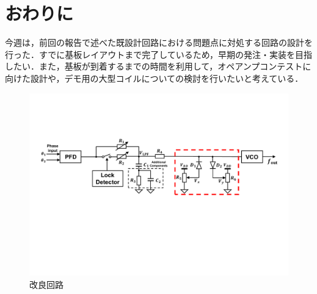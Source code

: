 \documentclass[twocolumn]{jsarticle}
\begin{document}
\section{おわりに}
今週は，前回の報告で述べた既設計回路における問題点に対処する回路の設計を行った．すでに基板レイアウトまで完了しているため，早期の発注・実装を目指したい．また，基板が到着するまでの時間を利用して，オペアンプコンテストに向けた設計や，デモ用の大型コイルについての検討を行いたいと考えている．

\begin{figure}[b]
\begin{center}

\includegraphics[width=160mm]{figures/1.pdf}
\caption{改良回路}

\end{center}
\end{figure}
\end{document}
